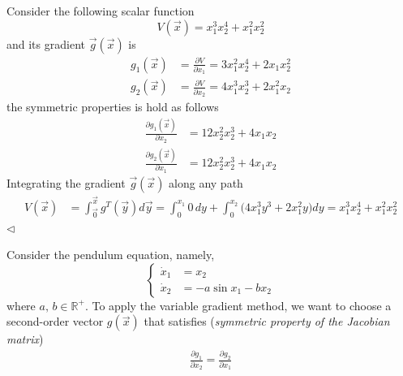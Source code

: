 \documentclass[12pt,a4paper,oneside]{book}
\begin{document}
\begin{onehalfspace}
\begin{example}
	Consider the following scalar function
	\begin{equation*}
		V(\vec{x})=x_1^3x_2^4+x_1^2x_2^2
	\end{equation*} 
	and its gradient $\vec{g}(\vec{x})$ is
	\begin{equation*}
		\begin{aligned}
			g_1(\vec{x}) &= \frac{\partial V}{\partial x_1} = 
			3x_1^2x_2^4+2x_1x_2^2 \\[8pt] 
			g_2(\vec{x}) &= \frac{\partial V}{\partial x_2} = 
			4x_1^3x_2^3+2x_1^2x_2
		\end{aligned}
	\end{equation*} 
	the symmetric properties is hold as follows 
	\begin{equation*}
		\begin{aligned}
			\frac{\partial g_1(\vec{x})}{\partial x_2} &= 12x_2^2x_2^3+4x_1x_2 
			\\[8pt] 
			\frac{\partial g_2(\vec{x})}{\partial x_1} &= 12x_2^2x_2^3+4x_1x_2
		\end{aligned}
	\end{equation*} 
	Integrating the gradient $\vec{g}(\vec{x})$ along any path 
	\begin{equation*}
		\begin{aligned}
			V(\vec{x})&=\int_{\vec{0}}^{\vec{x}}g^T(\vec{y})d\vec{y} = 
			\int_{0}^{x_1}0\,dy+\int_{0}^{x_2}\Big(4x_1^3y^3+2x_1^2y\Big)dy=x_1^3x_2^4+x_1^2x_2^2
		\end{aligned}
	\end{equation*}
	$\triangleleft$
\end{example}


\begin{example}
	Consider the pendulum equation, namely, 
	\begin{equation*}
		\left\lbrace \begin{aligned}
			\dot{x}_1 &=  x_2 \\[6pt] 
			\dot{x}_2 &= -a\sin x_1 -b x_2
		\end{aligned}\right. 
	\end{equation*}
	where $a,\,b\in\mathbb{R}^+$. To apply the variable gradient method, we 
	want to choose a second-order vector $g(\vec{x})$ that satisfies 
	(\textit{symmetric property of the Jacobian matrix})
	\begin{equation*}
		\begin{aligned}
			\frac{\partial g_1}{\partial x_2} = \frac{\partial g_2}{\partial 
			x_1}
		\end{aligned}
	\end{equation*}
	

\end{example}
\end{onehalfspace}
\end{document}
